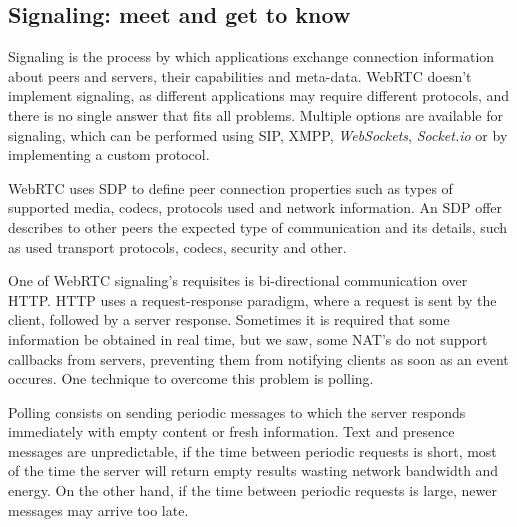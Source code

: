 \subsection{Signaling: meet and get to know}
\label{signaling}


  Signaling is the process by which applications exchange connection information about peers and servers, their capabilities and meta-data.
  \ac{WebRTC} doesn't implement signaling, as different applications may require different protocols, and there is no single answer that fits all problems.
  Multiple options are available for signaling, which can be performed using \ac{SIP}, \ac{XMPP}, \emph{WebSockets}, \emph{Socket.io} or by implementing a custom protocol.

  \ac{WebRTC} uses \ac{SDP} \cite{rfc4566} to define peer connection properties such as types of supported media, codecs, protocols used and network information. An \ac{SDP} offer describes to other peers the expected type of communication and its details, such as used transport protocols, codecs, security and other.

  One of \ac{WebRTC} signaling's requisites is bi-directional communication over \ac{HTTP}.
  \ac{HTTP} uses a request-response paradigm, where a request is sent by the client, followed by a server response.
  Sometimes it is required that some information be obtained in real time, but we saw, some \ac{NAT}'s do not support callbacks from servers, preventing them from notifying clients as soon as an event occures.
One technique to overcome this problem is polling.
  
Polling consists on sending periodic messages to which the server responds immediately with empty content or fresh information. Text and presence messages are unpredictable, if the time between periodic requests is short, most of the time the server will return empty results wasting network bandwidth and energy. On the other hand, if the time between periodic requests is large, newer messages may arrive too late.

